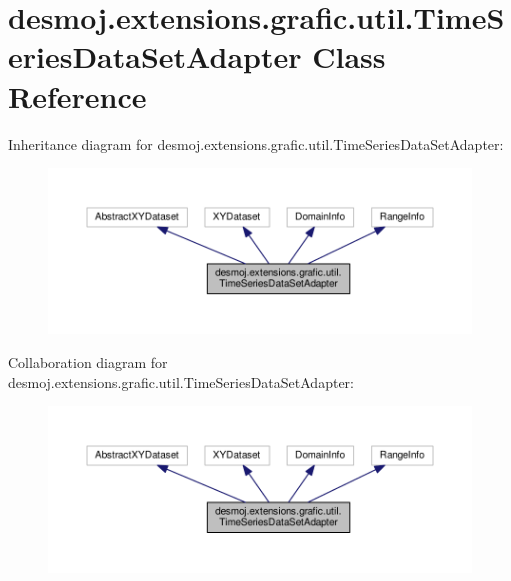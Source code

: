 \section{desmoj.\-extensions.\-grafic.\-util.\-Time\-Series\-Data\-Set\-Adapter Class Reference}
\label{classdesmoj_1_1extensions_1_1grafic_1_1util_1_1_time_series_data_set_adapter}


Inheritance diagram for desmoj.\-extensions.\-grafic.\-util.\-Time\-Series\-Data\-Set\-Adapter\-:
\nopagebreak
\begin{figure}[H]
\begin{center}
\leavevmode
\includegraphics[width=350pt]{classdesmoj_1_1extensions_1_1grafic_1_1util_1_1_time_series_data_set_adapter__inherit__graph}
\end{center}
\end{figure}


Collaboration diagram for desmoj.\-extensions.\-grafic.\-util.\-Time\-Series\-Data\-Set\-Adapter\-:
\nopagebreak
\begin{figure}[H]
\begin{center}
\leavevmode
\includegraphics[width=350pt]{classdesmoj_1_1extensions_1_1grafic_1_1util_1_1_time_series_data_set_adapter__coll__graph}
\end{center}
\end{figure}
